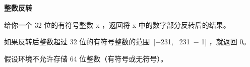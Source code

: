 \textbf{整数反转}\par

给你一个 32 位的有符号整数 x ，返回将 x 中的数字部分反转后的结果。\par

如果反转后整数超过 32 位的有符号整数的范围 [−231,  231 − 1] ，就返回 0。\par

假设环境不允许存储 64 位整数（有符号或无符号）。\par

